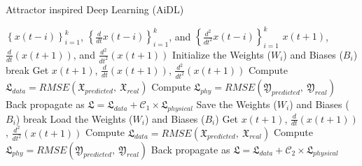 \documentclass[conference]{IEEEtran}
\begin{document}
\begin{algorithm}
\caption{Attractor inspired Deep Learning (AiDL)}\label{alg1}
\begin{algorithmic}[1]
\Require $\left\{x\left(t-i\right)\right\}_{i=1}^k$, $\left\{\frac{d}{dt}x\left(t-i\right)\right\}_{i=1}^k$, and $\left\{\frac{d^2}{dt^2}x\left(t-i\right)\right\}_{i=1}^k$
\Ensure $x\left(t+1\right)$, $\frac{d}{dt}\left(x\left(t+1\right)\right)$, and $\frac{d^2}{dt^2}\left(x\left(t+1\right)\right)$
		\State Initialize the Weights ($W_i$) and Biases ($B_i$)
                				\State break
                			\EndIf
                		\State Get $x\left(t+1\right)$, $\frac{d}{dt}\left(x\left(t+1\right)\right)$, $\frac{d^2}{dt^2}\left(x\left(t+1\right)\right)$
                		\State Compute $\mathfrak{L}_{data}=RMSE\left(\mathfrak{X}_{predicted},\ \mathfrak{X}_{real}\right)$
                		\State Compute $\mathfrak{L}_{phy}=RMSE\left(\mathfrak{Y}_{predicted},\ \mathfrak{Y}_{real}\right)$
                		\State Back propagate as $\mathfrak{L}=\mathfrak{L}_{data}+\mathcal{C}_1\times\mathfrak{L}_{physical}$ 
                		\State Save the Weights ($W_i$) and Biases ($B_i$)
                		\EndFor
                \Else
                				\State break
                			\EndIf
                		\State Load the Weights ($W_i$) and Biases ($B_i$)
                		\State Get $x\left(t+1\right)$, $\frac{d}{dt}\left(x\left(t+1\right)\right)$, $\frac{d^2}{dt^2}\left(x\left(t+1\right)\right)$
                		\State Compute $\mathfrak{L}_{data}=RMSE\left(\mathfrak{X}_{predicted},\ \mathfrak{X}_{real}\right)$
                		\State Compute $\mathfrak{L}_{phy}=RMSE\left(\mathfrak{Y}_{predicted},\ \mathfrak{Y}_{real}\right)$
                		\State Back propagate as $\mathfrak{L}=\mathfrak{L}_{data}+\mathcal{C}_2\times\mathfrak{L}_{physical}$ 
                		\EndFor
                \EndIf
      \EndFunction
\end{algorithmic}
\end{algorithm}
\end{document}
